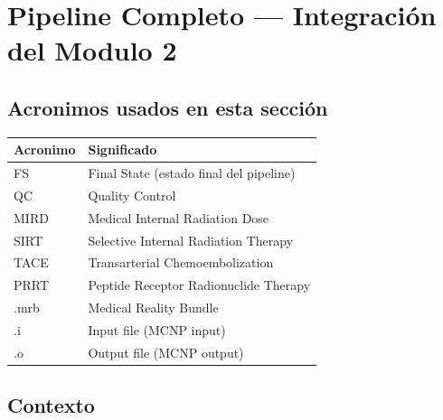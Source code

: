\documentclass[12pt,a4paper]{article}
\begin{document}
\begin{tcolorbox}[aiSupervisor]
\begin{tcolorbox}[aiSupervisor]

\newpage


\newpage


\newpage

\end{tcolorbox}
\end{tcolorbox}
\section{Pipeline Completo --- Integración del Modulo 2}
\label{sec:pipeline}

\subsection*{Acronimos usados en esta sección}
\begin{tabular}{ll}
\toprule
\textbf{Acronimo} & \textbf{Significado} \\
\midrule
FS & Final State (estado final del pipeline) \\
QC & Quality Control \\
MIRD & Medical Internal Radiation Dose \\
SIRT & Selective Internal Radiation Therapy \\
TACE & Transarterial Chemoembolization \\
PRRT & Peptide Receptor Radionuclide Therapy \\
.mrb & Medical Reality Bundle \\
.i & Input file (MCNP input) \\
.o & Output file (MCNP output) \\
\bottomrule
\end{tabular}

\subsection{Contexto}
\end{document}
